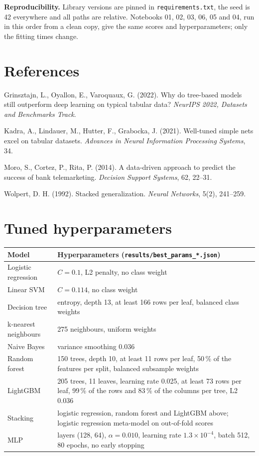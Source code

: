 \documentclass[11pt,a4paper]{article}
\begin{document}
\textbf{Reproducibility.} Library versions are pinned in \texttt{requirements.txt}, the seed is 42 everywhere and
all paths are relative. Notebooks 01, 02, 03, 06, 05 and 04, run in this order from a clean copy, give the same
scores and hyperparameters; only the fitting times change.

\section*{References}
\small
Grinsztajn, L., Oyallon, E., Varoquaux, G. (2022). Why do tree-based models still outperform deep learning on typical
tabular data? \emph{NeurIPS 2022, Datasets and Benchmarks Track}.

Kadra, A., Lindauer, M., Hutter, F., Grabocka, J. (2021). Well-tuned simple nets excel on tabular datasets.
\emph{Advances in Neural Information Processing Systems}, 34.

Moro, S., Cortez, P., Rita, P. (2014). A data-driven approach to predict the success of bank telemarketing.
\emph{Decision Support Systems}, 62, 22--31.

Wolpert, D. H. (1992). Stacked generalization. \emph{Neural Networks}, 5(2), 241--259.

\normalsize
\appendix
\section{Tuned hyperparameters}
\begin{table}[H]
\centering\small
\begin{tabularx}{\textwidth}{l L}
\toprule
Model & Hyperparameters (\texttt{results/best\_params\_*.json}) \\
\midrule
Logistic regression & $C=0.1$, L2 penalty, no class weight \\
Linear SVM & $C=0.114$, no class weight \\
Decision tree & entropy, depth 13, at least 166 rows per leaf, balanced class weights \\
k-nearest neighbours & 275 neighbours, uniform weights \\
Naive Bayes & variance smoothing 0.036 \\
Random forest & 150 trees, depth 10, at least 11 rows per leaf, 50\,\% of the features per split, balanced subsample weights \\
LightGBM & 205 trees, 11 leaves, learning rate 0.025, at least 73 rows per leaf, 99\,\% of the rows and 83\,\% of the columns per tree, L2 0.036 \\
Stacking & logistic regression, random forest and LightGBM above; logistic regression meta-model on out-of-fold scores \\
MLP & layers (128, 64), $\alpha=0.010$, learning rate $1.3\times10^{-4}$, batch 512, 80 epochs, no early stopping \\
\bottomrule
\end{tabularx}
\end{table}
\end{document}
